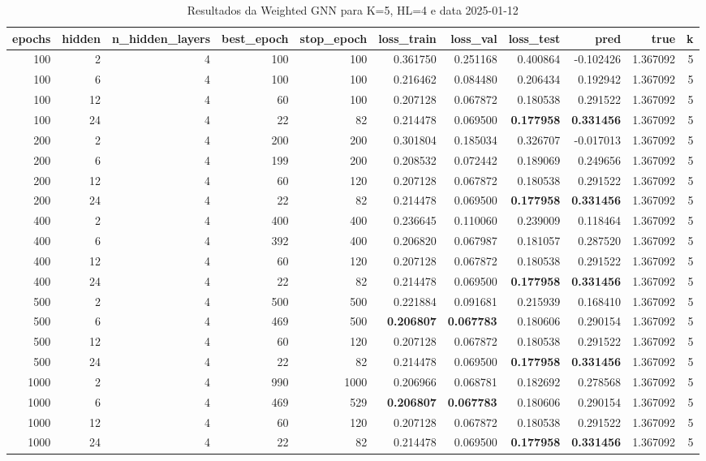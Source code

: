 \begin{table}
\caption{Resultados da Weighted GNN para K=5, HL=4 e data 2025-01-12}
\label{tab:weighted_gnn_results_k5_hl4_d20250112}
\begin{tabular}{rrrrrrrrrrr}
\toprule
epochs & hidden & n\_hidden\_layers & best\_epoch & stop\_epoch & loss\_train & loss\_val & loss\_test & pred & true & k \\
\midrule
100 & 2 & 4 & 100 & 100 & 0.361750 & 0.251168 & 0.400864 & -0.102426 & 1.367092 & 5 \\
100 & 6 & 4 & 100 & 100 & 0.216462 & 0.084480 & 0.206434 & 0.192942 & 1.367092 & 5 \\
100 & 12 & 4 & 60 & 100 & 0.207128 & 0.067872 & 0.180538 & 0.291522 & 1.367092 & 5 \\
100 & 24 & 4 & 22 & 82 & 0.214478 & 0.069500 & \textbf{0.177958} & \textbf{0.331456} & 1.367092 & 5 \\
200 & 2 & 4 & 200 & 200 & 0.301804 & 0.185034 & 0.326707 & -0.017013 & 1.367092 & 5 \\
200 & 6 & 4 & 199 & 200 & 0.208532 & 0.072442 & 0.189069 & 0.249656 & 1.367092 & 5 \\
200 & 12 & 4 & 60 & 120 & 0.207128 & 0.067872 & 0.180538 & 0.291522 & 1.367092 & 5 \\
200 & 24 & 4 & 22 & 82 & 0.214478 & 0.069500 & \textbf{0.177958} & \textbf{0.331456} & 1.367092 & 5 \\
400 & 2 & 4 & 400 & 400 & 0.236645 & 0.110060 & 0.239009 & 0.118464 & 1.367092 & 5 \\
400 & 6 & 4 & 392 & 400 & 0.206820 & 0.067987 & 0.181057 & 0.287520 & 1.367092 & 5 \\
400 & 12 & 4 & 60 & 120 & 0.207128 & 0.067872 & 0.180538 & 0.291522 & 1.367092 & 5 \\
400 & 24 & 4 & 22 & 82 & 0.214478 & 0.069500 & \textbf{0.177958} & \textbf{0.331456} & 1.367092 & 5 \\
500 & 2 & 4 & 500 & 500 & 0.221884 & 0.091681 & 0.215939 & 0.168410 & 1.367092 & 5 \\
500 & 6 & 4 & 469 & 500 & \textbf{0.206807} & \textbf{0.067783} & 0.180606 & 0.290154 & 1.367092 & 5 \\
500 & 12 & 4 & 60 & 120 & 0.207128 & 0.067872 & 0.180538 & 0.291522 & 1.367092 & 5 \\
500 & 24 & 4 & 22 & 82 & 0.214478 & 0.069500 & \textbf{0.177958} & \textbf{0.331456} & 1.367092 & 5 \\
1000 & 2 & 4 & 990 & 1000 & 0.206966 & 0.068781 & 0.182692 & 0.278568 & 1.367092 & 5 \\
1000 & 6 & 4 & 469 & 529 & \textbf{0.206807} & \textbf{0.067783} & 0.180606 & 0.290154 & 1.367092 & 5 \\
1000 & 12 & 4 & 60 & 120 & 0.207128 & 0.067872 & 0.180538 & 0.291522 & 1.367092 & 5 \\
1000 & 24 & 4 & 22 & 82 & 0.214478 & 0.069500 & \textbf{0.177958} & \textbf{0.331456} & 1.367092 & 5 \\
\bottomrule
\end{tabular}
\end{table}

